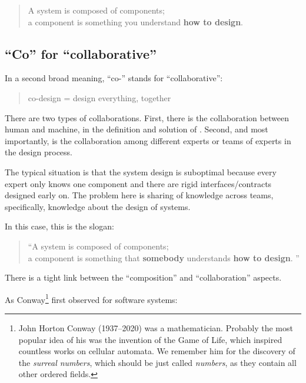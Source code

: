 \begin{quote}
    A system is composed of components;\\
    a component is something you understand
    \textbf{how to design}.
\end{quote}

\subsection{``Co'' for ``collaborative''}

In a second broad meaning, ``co-'' stands for ``collaborative'':

\begin{quote}
    co-design = design everything, together
\end{quote}

There are two types of collaborations.
First, there is the collaboration between human and machine, in the definition and solution of .
Second, and most importantly, is the collaboration among different experts or teams of experts in the design process.

The typical situation is that the system design is suboptimal because every expert only knows one component and there are rigid interfaces/contracts designed early on.
The problem here is sharing of knowledge across teams, specifically, knowledge about the design of systems.

In this case, this is the slogan:

\begin{quote}
    \enquote{A system is composed of components;\\
        a component is something that \textbf{somebody} understands
        \textbf{how to design}.
    }
\end{quote}

There is a tight link between the ``composition'' and ``collaboration'' aspects.

As Conway\footnote{John Horton Conway (1937--2020) was a mathematician.
    Probably the most popular idea of his was the invention of the Game of Life, which inspired countless works on cellular automata.
    We remember him for the discovery of the \emph{surreal numbers}, which should be just called \emph{numbers}, as they contain all other ordered fields.
} first observed for software systems:


